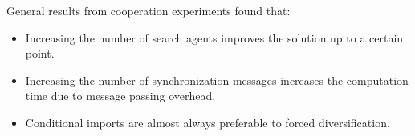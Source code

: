 \documentclass[12pt,titlepage]{article}
\begin{document}
      General results from cooperation experiments found that:
      \begin{itemize}
        \item Increasing the number of search agents improves the solution up to a certain point.
        \item Increasing the number of synchronization messages increases the computation time due to message passing overhead.
        \item Conditional imports are almost always preferable to forced diversification.
      \end{itemize}
\end{document}
